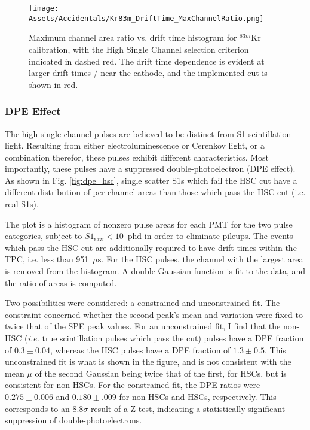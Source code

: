 \begin{figure}
    \centering
    \texttt{[image: Assets/Accidentals/Kr83m\_DriftTime\_MaxChannelRatio.png]}
    \caption[Maximum channel area ratio vs. drift time histogram for $^{83m}$Kr calibration, with the High Single Channel selection criterion indicated in dashed red.]%
    {Maximum channel area ratio vs. drift time histogram for $^{83m}$Kr calibration, with the High Single Channel selection criterion indicated in dashed red.
    The drift time dependence is evident at larger drift times / near the cathode, and the implemented cut is shown in red.
    }
    \label{fig:max_channel_krypton}
\end{figure}

\subsubsection{DPE Effect}
The high single channel pulses are believed to be distinct from S1 scintillation light.
Resulting from either electroluminescence or Cerenkov light, or a combination therefor, these pulses exhibit different characteristics.
Most importantly, these pulses have a suppressed double-photoelectron (DPE effect\cite{akerib_extending_2020}).
As shown in Fig. \ref{fig:dpe_hsc}, single scatter S1s which fail the HSC cut have a different distribution of per-channel areas than those which pass the HSC cut (i.e. real S1s).

The plot is a histogram of nonzero pulse areas for each PMT for the two pulse categories, subject to $S1_{\text{raw}}<10$~phd in order to eliminate pileups.
The events which pass the HSC cut are additionally required to have drift times within the TPC, i.e. less than 951~$\mu\mathrm{s}$.
For the HSC pulses, the channel with the largest area is removed from the histogram.
A double-Gaussian function is fit to the data, and the ratio of areas is computed.

Two possibilities were considered: a constrained and unconstrained fit.
The constraint concerned whether the second peak's mean and variation were fixed to twice that of the SPE peak values.
For an unconstrained fit, I find that the non-HSC (\textit{i.e.} true scintillation pulses which pass the cut) pulses have a DPE fraction of $0.3 \pm 0.04$, whereas the HSC pulses have a DPE fraction of $1.3 \pm 0.5$. 
This unconstrained fit is what is shown in the figure, and is not consistent with the mean $\mu$ of the second Gaussian being twice that of the first, for HSCs, but is consistent for non-HSCs.
For the constrained fit, the DPE ratios were $0.275\pm 0.006$ and $0.180 \pm .009$ for non-HSCs and HSCs, respectively.
This corresponds to an $8.8\sigma$ result of a Z-test, indicating a statistically significant suppression of double-photoelectrons.

